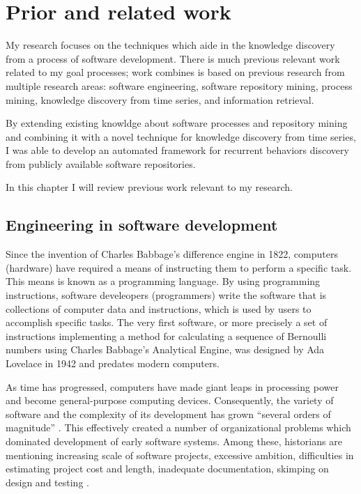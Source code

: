 \chapter{Prior and related work}\label{chapter_background_work}
My research focuses on the techniques which aide in the knowledge discovery from a process of 
software development. There is much previous relevant work related to my goal processes; work combines is based on previous research from multiple research areas: software engineering, 
software repository mining, process mining, knowledge discovery from time series,
and information retrieval. 

By extending existing knowldge about software processes and repository mining and combining 
it with a novel technique for knowledge discovery from time series, 
I was able to develop an automated framework for recurrent behaviors discovery from publicly 
available software repositories.

In this chapter I will review previous work relevant to my research.

\section{Engineering in software development}
Since the invention of Charles Babbage’s difference engine in 1822, computers (hardware) 
have required a means of instructing them to perform a specific task. This means is known 
as a programming language. By using programming instructions, software develeopers (programmers)
write the software that is collections of computer data and instructions, which is used by 
users to accomplish specific tasks. The very first software, or more precisely a set of 
instructions implementing a method for calculating a sequence of Bernoulli numbers using 
Charles Babbage's Analytical Engine, was designed by Ada Lovelace in 1942 and predates modern 
computers. 

As time has progressed, computers have made giant leaps in processing power and become 
general-purpose computing devices. Consequently, the variety of software and 
the complexity of its development has grown ``several orders of magnitude'' \cite{naur_crisis_68}. 
This effectively created a number of organizational problems which dominated development of 
early software systems. Among these, historians are mentioning increasing scale of software projects, 
excessive ambition, difficulties in estimating project cost and length, inadequate documentation, 
skimping on design and testing \cite{mahoney_roots_1990} \cite{citeulike:12748733} 
\cite{citeulike:833903}.

